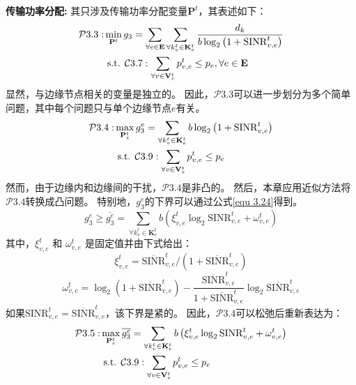 \textbf{传输功率分配:} 其只涉及传输功率分配变量$\mathbf{P}^{t}$，其表述如下：
\begin{align}
	\mathcal{P}3.3: &\min_{\mathbf{P}^{t}} g_3= \sum_{ \forall e \in \mathbf{E}} \sum_{\forall k_{v}^{t} \in \mathbf{K}_{e}^{t}}  \frac{d_{k}}{b  \log _{2}\left(1+\mathrm{SINR}_{v, e}^t\right)} \notag \\
	&\text { s.t. } \mathcal{C}3.7: \sum_{\forall v \in \mathbf{V}_{e}^{t}} p_{v, e}^{t} \leq p_{e}, \forall e \in \mathbf{E}
\end{align}
显然，与边缘节点相关的变量是独立的。
因此，$\mathcal{P}3.3$可以进一步划分为多个简单问题，其中每个问题只与单个边缘节点$e$有关。
\begin{align}
	\mathcal{P}3.4: & \max_{\mathbf{P}_{e}^{t}}  g_3^e= \sum_{\forall k_{v}^{t} \in \mathbf{K}_{e}^{t}} {b  \log _{2}\left(1+\mathrm{SINR}_{v, e}^t\right)} \notag \\
	&\text { s.t. } \mathcal{C}3.9: \sum_{\forall v \in \mathbf{V}_{e}^{t}} p_{v, e}^{t} \leq p_{e}  
\end{align}
然而，由于边缘内和边缘间的干扰，$\mathcal{P}3.4$是非凸的。
然后，本章应用近似方法将$\mathcal{P}3.4$转换成凸问题。
特别地，$g_3^e$的下界可以通过公式\ref{equ 3.24}\cite{papandriopoulos2006low}得到。
\begin{equation}
	g_3^e \geq \overline{g_3^e} = \sum_{\forall k_{v}^{t} \in \mathbf{K}_{e}^{t}} {b \left( \xi_{v, e}^{t} \log _{2}\mathrm{SINR}_{v, e}^t + \omega_{v, e}^{t} \right) }
	\label{equ 3.24}
\end{equation}
其中，$\xi_{v, e}^{t}$ 和 $\omega_{v, e}^{t}$ 是固定值并由下式给出：
\begin{equation}
	\xi_{v, e}^{t} = \overline{\mathrm{SINR}}_{v, e}^t \bigg/ ( 1 + \overline{\mathrm{SINR}}_{v, e}^t )
\end{equation}
\begin{equation}
	\omega_{v, e}^{t} = \log _{2} (1+ \overline{\mathrm{SINR}}_{v, e}^t) - \frac{\overline{\mathrm{SINR}}_{v, e}^t}{1 + \overline{\mathrm{SINR}}_{v, e}^t} \log _{2}\overline{\mathrm{SINR}}_{v, e}^t
\end{equation}
如果${\mathrm{SINR}}_{v, e}^t =\overline{\mathrm{SINR}}_{v, e}^t$，该下界是紧的。
因此，$\mathcal{P}3.4$可以松弛后重新表达为：
\begin{align}
	\mathcal{P}3.5: & \max_{\mathbf{P}_{e}^{t}}  \overline{g_3^e}= \sum_{\forall k_{v}^{t} \in \mathbf{K}_{e}^{t}} {b \left( \xi_{v, e}^{t} \log _{2}\mathrm{SINR}_{v, e}^t + \omega_{v, e}^{t} \right) } \notag \\
	&\text { s.t. } \mathcal{C}3.9: \sum_{\forall v \in \mathbf{V}_{e}^{t}} p_{v, e}^{t} \leq p_{e}  
\end{align}

